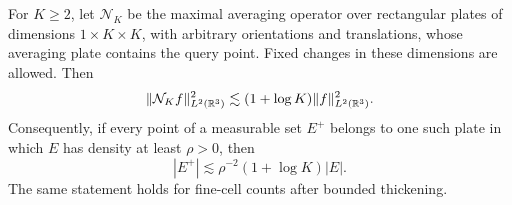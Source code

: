 \begin{lemma}
\label{lem:plate-nikodym}
For $K\geq2$, let $\mathcal N_K$ be the maximal averaging operator
over rectangular plates of dimensions $1\times K\times K$, with
arbitrary orientations and translations, whose averaging plate
contains the query point.  Fixed changes in these dimensions are
allowed.  Then
\begin{equation}
 \|\mathcal N_K f\|_{L^2(\mathbb R^3)}^2
       \lesssim(1+\log K)\|f\|_{L^2(\mathbb R^3)}^2.
 \label{loc:nikodym-l2}
\end{equation}
Consequently, if every point of a measurable set $E^+$ belongs to
one such plate in which $E$ has density at least $\rho>0$, then
\begin{equation}
 |E^+|\lesssim \rho^{-2}(1+\log K)|E|.
 \label{loc:nikodym-density}
\end{equation}
The same statement holds for fine-cell counts after bounded
thickening.
\end{lemma}

